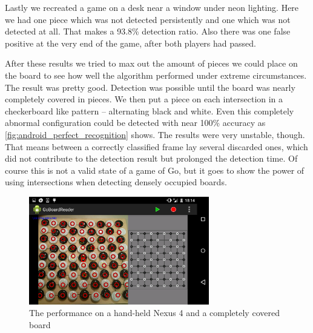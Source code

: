 	Lastly we recreated a game on a desk near a window under neon lighting. Here we had one piece which was not detected persistently and one which was not detected at all. That makes a 93.8\% detection ratio. Also there was one false positive at the very end of the game, after both players had passed.

	After these results we tried to max out the amount of pieces we could place on the board to see how well the algorithm performed under extreme circumstances. The result was pretty good. Detection was possible until the board was nearly completely covered in pieces. We then put a piece on each intersection in a checkerboard like pattern -- alternating black and white. Even this completely abnormal configuration could be detected with near 100\% accuracy as \autoref{fig:android_perfect_recognition} shows. The results were very unstable, though. That means between a correctly classified frame lay several discarded ones, which did not contribute to the detection result but prolonged the detection time. Of course this is not a valid state of a game of Go, but it goes to show the power of using intersections when detecting densely occupied boards.

	\begin{figure}[h]
		\center
		\includegraphics[width=0.7\textwidth]{images/android_perfect_recognition.png}
		\caption{The performance on a hand-held Nexus 4 and a completely covered board}
		\label{fig:android_perfect_recognition}
	\end{figure}
